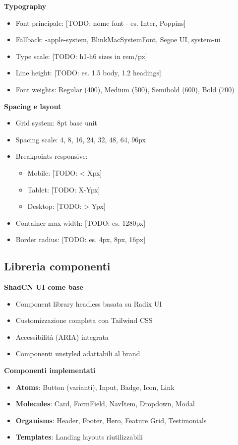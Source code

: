 \textbf{Typography}
\begin{itemize}
  \item Font principale: [TODO: nome font - es. Inter, Poppins]
  \item Fallback: -apple-system, BlinkMacSystemFont, Segoe UI, system-ui
  \item Type scale: [TODO: h1-h6 sizes in rem/px]
  \item Line height: [TODO: es. 1.5 body, 1.2 headings]
  \item Font weights: Regular (400), Medium (500), Semibold (600), Bold (700)
\end{itemize}

\textbf{Spacing e layout}
\begin{itemize}
  \item Grid system: 8pt base unit
  \item Spacing scale: 4, 8, 16, 24, 32, 48, 64, 96px
  \item Breakpoints responsive:
    \begin{itemize}
      \item Mobile: [TODO: < Xpx]
      \item Tablet: [TODO: X-Ypx]
      \item Desktop: [TODO: > Ypx]
    \end{itemize}
  \item Container max-width: [TODO: es. 1280px]
  \item Border radius: [TODO: es. 4px, 8px, 16px]
\end{itemize}

\subsection{Libreria componenti}
\textbf{ShadCN UI come base}
\begin{itemize}
  \item Component library headless basata su Radix UI
  \item Customizzazione completa con Tailwind CSS
  \item Accessibilità (ARIA) integrata
  \item Componenti unstyled adattabili al brand
\end{itemize}

\textbf{Componenti implementati}
\begin{itemize}
  \item \textbf{Atoms}: Button (varianti), Input, Badge, Icon, Link
  \item \textbf{Molecules}: Card, FormField, NavItem, Dropdown, Modal
  \item \textbf{Organisms}: Header, Footer, Hero, Feature Grid, Testimonials
  \item \textbf{Templates}: Landing layouts riutilizzabili
\end{itemize}

